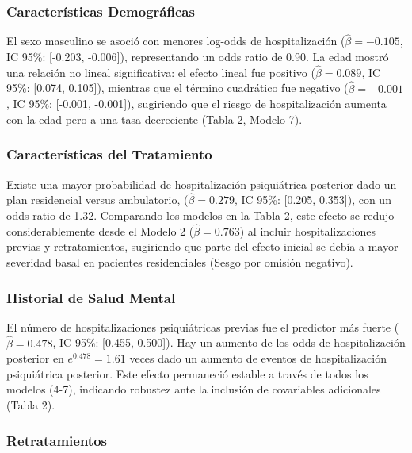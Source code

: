 \documentclass[
  spanish,
  10pt,
]{article}
\begin{document}
\subsubsection{Características
Demográficas}\label{caracteruxedsticas-demogruxe1ficas}

El sexo masculino se asoció con menores log-odds de hospitalización
(\(\hat{\beta} = -0.105\), IC 95\%: {[}-0.203, -0.006{]}), representando
un odds ratio de 0.90. La edad mostró una relación no lineal
significativa: el efecto lineal fue positivo (\(\hat{\beta} = 0.089\),
IC 95\%: {[}0.074, 0.105{]}), mientras que el término cuadrático fue
negativo (\(\hat{\beta} = -0.001\), IC 95\%: {[}-0.001, -0.001{]}),
sugiriendo que el riesgo de hospitalización aumenta con la edad pero a
una tasa decreciente (Tabla 2, Modelo 7).

\subsubsection{Características del
Tratamiento}\label{caracteruxedsticas-del-tratamiento}

Existe una mayor probabilidad de hospitalización psiquiátrica posterior
dado un plan residencial versus ambulatorio, (\(\hat{\beta} = 0.279\),
IC 95\%: {[}0.205, 0.353{]}), con un odds ratio de 1.32. Comparando los
modelos en la Tabla 2, este efecto se redujo considerablemente desde el
Modelo 2 (\(\hat{\beta} = 0.763\)) al incluir hospitalizaciones previas
y retratamientos, sugiriendo que parte del efecto inicial se debía a
mayor severidad basal en pacientes residenciales (Sesgo por omisión
negativo).

\subsubsection{Historial de Salud
Mental}\label{historial-de-salud-mental}

El número de hospitalizaciones psiquiátricas previas fue el predictor
más fuerte (\(\hat{\beta} = 0.478\), IC 95\%: {[}0.455, 0.500{]}). Hay
un aumento de los odds de hospitalización posterior en
\(e^{0.478} = 1.61\) veces dado un aumento de eventos de hospitalización
psiquiátrica posterior. Este efecto permaneció estable a través de todos
los modelos (4-7), indicando robustez ante la inclusión de covariables
adicionales (Tabla 2).

\subsubsection{Retratamientos}\label{retratamientos}
\end{document}
